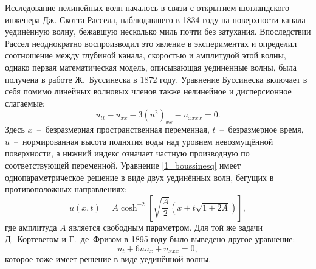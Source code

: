 \documentclass[12pt, a4paper]{report}
\newcommand{\lb}{\left (}
\newcommand{\rb}{\right )}
\newcommand{\lsq}{\left [}
\newcommand{\rsq}{\right ]}
\begin{document}
Исследование нелинейных волн началось в связи с открытием шотландского инженера Дж. Скотта Рассела, наблюдавшего в 1834 году на поверхности канала уединённую волну, бежавшую несколько миль почти без затухания. Впоследствии Рассел неоднократно воспроизводил это явление в экспериментах и определил соотношение между глубиной канала, скоростью и амплитудой этой волны,
однако первая математическая модель, описывающая уединённые волны, была получена в работе Ж.~Буссинеска в 1872 году.
Уравнение Буссинеска включает в себя помимо линейных волновых членов также нелинейное и дисперсионное слагаемые:
\begin{equation}\label{1_boussinesq}
u_{tt} - u_{xx} - 3 (u^2)_{xx} - u_{xxxx} = 0.
\end{equation}
Здесь $x$~--~безразмерная пространственная переменная, $t$~--~безразмерное время, $u$~--~нормированная высота поднятия воды над уровнем невозмущённой поверхности, а нижний индекс означает частную производную по соответствующей переменной.
Уравнение \eqref{1_boussinesq} имеет однопараметрическое решение в виде двух уединённых волн, бегущих в противоположных направлениях:
\begin{equation}\label{1_soliton_bouss}
u(x,t) = A \cosh^{-2}\lsq\sqrt{\frac{A}{2}}\lb x \pm t\sqrt{1 + 2A} \rb\rsq,
\end{equation}
где амплитуда $A$ является свободным параметром.
Для той же задачи %
Д.~Кортевегом и Г.~де~Фризом в 1895 году было выведено другое уравнение:
\begin{equation}\label{1_kdv}
u_{t} + 6 u u_x + u_{xxx} = 0,
\end{equation}
которое тоже имеет решение в виде уединённой волны.
\end{document}

